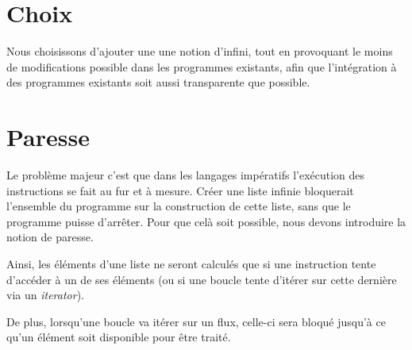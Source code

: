 \documentclass{article}
\begin{document}
\section{Choix}
Nous choisissons d'ajouter une une notion d'infini, tout en provoquant le moins de
modifications possible dans les programmes existants, afin que l'intégration à
des programmes existants soit aussi transparente que possible.

\section{Paresse}
Le problème majeur c'est que dans les langages impératifs l'exécution des instructions
se fait au fur et à mesure.
Créer une liste infinie bloquerait l'ensemble du programme sur la construction de
cette liste, sans que le programme puisse d'arrêter.
Pour que celà soit possible, nous devons introduire la notion de paresse.

Ainsi, les éléments d'une liste ne seront calculés que si une instruction tente
d'accéder à un de ses éléments (ou si une boucle tente d'itérer sur cette dernière
via un \emph{iterator}).

De plus, lorsqu'une boucle va itérer sur un flux, celle-ci sera bloqué jusqu'à ce
qu'un élément soit disponible pour être traité.
\end{document}
